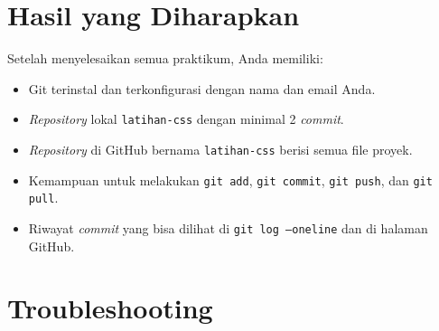 \section{Hasil yang Diharapkan}
\label{sec:git-hasil}

Setelah menyelesaikan semua praktikum, Anda memiliki:
\begin{itemize}
  \item Git terinstal dan terkonfigurasi dengan nama dan email Anda.
  \item \emph{Repository} lokal \texttt{latihan-css} dengan minimal 2 \emph{commit}.
  \item \emph{Repository} di GitHub bernama \texttt{latihan-css} berisi semua file proyek.
  \item Kemampuan untuk melakukan \texttt{git add}, \texttt{git commit}, \texttt{git push}, dan \texttt{git pull}.
  \item Riwayat \emph{commit} yang bisa dilihat di \texttt{git log --oneline} dan di halaman GitHub.
\end{itemize}

\section{Troubleshooting}
\label{sec:git-trouble}

